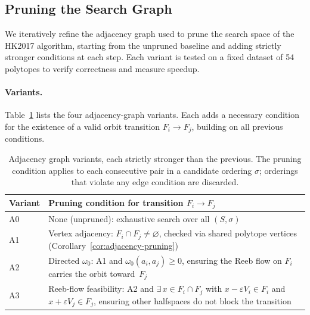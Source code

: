 %
%
%

\subsection{Pruning the Search Graph}
\label{sec:ablation-pruning}

We iteratively refine the adjacency graph used to prune the search space
of the HK2017 algorithm, starting from the unpruned baseline and adding
strictly stronger conditions at each step. Each variant is tested on a
fixed dataset of 54 polytopes to verify correctness and measure speedup.

\paragraph{Variants.}
Table~\ref{tab:ablation-variants} lists the four adjacency-graph variants.
Each adds a necessary condition for the existence of a valid orbit transition
$F_i \to F_j$, building on all previous conditions.

\begin{table}[h]
\centering
\begin{tabular}{lp{9cm}}
\toprule
Variant & Pruning condition for transition $F_i \to F_j$ \\
\midrule
A0 & None (unpruned): exhaustive search over all $(S, \sigma)$ \\
A1 & Vertex adjacency: $F_i \cap F_j \neq \varnothing$, checked via shared polytope vertices (Corollary~\ref{cor:adjacency-pruning}) \\
A2 & Directed $\omega_0$: A1 and $\omega_0(a_i, a_j) \ge 0$, ensuring the Reeb flow on $F_i$ carries the orbit toward~$F_j$ \\
A3 & Reeb-flow feasibility: A2 and $\exists\, x \in F_i \cap F_j$ with $x - \varepsilon V_i \in F_i$ and $x + \varepsilon V_j \in F_j$, ensuring other halfspaces do not block the transition \\
\bottomrule
\end{tabular}
\caption{Adjacency graph variants, each strictly stronger than the previous.
  The pruning condition applies to each consecutive pair in a candidate ordering
  $\sigma$; orderings that violate any edge condition are discarded.}
\label{tab:ablation-variants}
\end{table}

